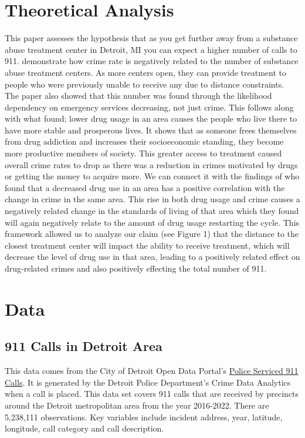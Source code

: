 \documentclass[12pt]{article}
\begin{document}
\section{Theoretical Analysis}
\label{sec:theory}
This paper assesses the hypothesis that as you get further away from a substance abuse treatment center in Detroit, MI you can expect a higher number of calls to 911. \cite{SAT_centers_and_crime} demonstrate how crime rate is negatively related to the number of substance abuse treatment centers. As more centers open, they can provide treatment to people who were previously unable to receive any due to distance constraints. The paper also showed that this number was found through the likelihood dependency on emergency services decreasing, not just crime. This follows along with what \cite{Socioeconomic-Determinants} found;  lower drug usage in an area causes the people who live there to have more stable and prosperous lives. It shows that as someone frees themselves from drug addiction and increases their socioeconomic standing, they become more productive members of society. This greater access to treatment caused overall crime rates to drop as there was a reduction in crimes motivated by drugs or getting the money to acquire more. We can connect it with the findings of \cite{drugs_and_crime} who found that a decreased drug use in an area has a positive correlation with the change in crime in the same area. This rise in both drug usage and crime causes a negatively related change in the standards of living of that area which they found will again negatively relate to the amount of drug usage restarting the cycle. This framework allowed us to analyze our claim (see Figure 1) that the distance to the closest treatment center will impact the ability to receive treatment, which will decrease the level of drug use in that area, leading to a positively related effect on drug-related crimes and also positively effecting the total number of 911. 



\section{Data}
\label{sec:data}

\subsection{911 Calls in Detroit Area}

This data comes from the City of Detroit Open Data Portal's   \href{https://data.detroitmi.gov/datasets/detroitmi::police-serviced-911-calls/about}{Police Serviced 911 Calls}. It is generated by the Detroit Police Department's Crime Data Analytics when a call is placed. This data set covers 911 calls that are received by precincts around the Detroit metropolitan area from the year 2016-2022. There are 5,238,111 observations. Key variables include incident address, year, latitude, longitude, call category and call description. 
\end{document}
